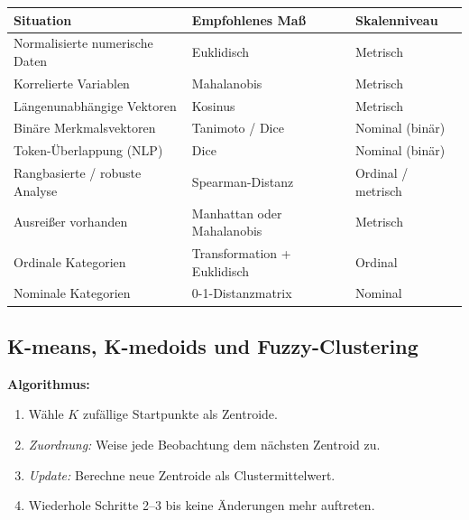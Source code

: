 \begin{center}
\small
\begin{tabular}{|l|l|l|}
\hline
\textbf{Situation} & \textbf{Empfohlenes Maß} & \textbf{Skalenniveau} \\
\hline
Normalisierte numerische Daten & Euklidisch & Metrisch \\
\hline
Korrelierte Variablen & Mahalanobis & Metrisch \\
\hline
Längenunabhängige Vektoren & Kosinus & Metrisch \\
\hline
Binäre Merkmalsvektoren & Tanimoto / Dice & Nominal (binär) \\
\hline
Token-Überlappung (NLP) & Dice & Nominal (binär) \\
\hline
Rangbasierte / robuste Analyse & Spearman-Distanz & Ordinal / metrisch \\
\hline
Ausreißer vorhanden & Manhattan oder Mahalanobis & Metrisch \\
\hline
Ordinale Kategorien & Transformation + Euklidisch & Ordinal \\
\hline
Nominale Kategorien & 0-1-Distanzmatrix & Nominal \\
\hline
\end{tabular}
\end{center}

\newpage

\subsection{K-means, K-medoids und Fuzzy-Clustering}


\textbf{Algorithmus:}
\begin{enumerate}[leftmargin=1.5em]
    \item Wähle $K$ zufällige Startpunkte als Zentroide.
    \item \emph{Zuordnung:} Weise jede Beobachtung dem nächsten Zentroid zu.
    \item \emph{Update:} Berechne neue Zentroide als Clustermittelwert.
    \item Wiederhole Schritte 2--3 bis keine Änderungen mehr auftreten.
\end{enumerate}

